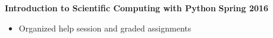 \documentclass[margin]{res}
\begin{document}
\begin{resume}

\textbf{Introduction to Scientific Computing with Python} \hfill{} \textbf{Spring 2016}
    \begin{itemize}\itemsep -2pt
    \item[] Organized help session and graded assignments
    \end{itemize} \vspace{-12pt}
    




\end{resume}
\end{document}
